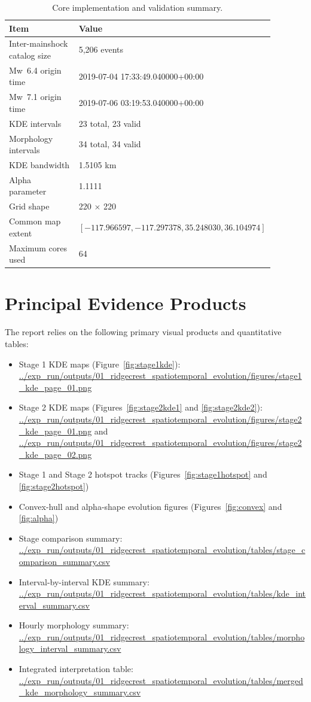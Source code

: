 \documentclass[11pt]{article}
\begin{document}
\begin{table}[H]
\centering
\caption{Core implementation and validation summary.}
\label{tab:workflow}
\begin{tabular}{p{0.42\linewidth}p{0.46\linewidth}}
\toprule
Item & Value \\
\midrule
Inter-mainshock catalog size & 5,206 events \\
Mw~6.4 origin time & 2019-07-04 17:33:49.040000+00:00 \\
Mw~7.1 origin time & 2019-07-06 03:19:53.040000+00:00 \\
KDE intervals & 23 total, 23 valid \\
Morphology intervals & 34 total, 34 valid \\
KDE bandwidth & 1.5105 km \\
Alpha parameter & 1.1111 \\
Grid shape & 220 $\times$ 220 \\
Common map extent & $[-117.966597, -117.297378, 35.248030, 36.104974]$ \\
Maximum cores used & 64 \\
\bottomrule
\end{tabular}
\end{table}

\section{Principal Evidence Products}
The report relies on the following primary visual products and quantitative tables:
\begin{itemize}[leftmargin=2em]
    \item Stage 1 KDE maps (Figure~\ref{fig:stage1kde}): \url{../exp_run/outputs/01_ridgecrest_spatiotemporal_evolution/figures/stage1_kde_page_01.png}
    \item Stage 2 KDE maps (Figures~\ref{fig:stage2kde1} and \ref{fig:stage2kde2}): \url{../exp_run/outputs/01_ridgecrest_spatiotemporal_evolution/figures/stage2_kde_page_01.png} and \url{../exp_run/outputs/01_ridgecrest_spatiotemporal_evolution/figures/stage2_kde_page_02.png}
    \item Stage 1 and Stage 2 hotspot tracks (Figures~\ref{fig:stage1hotspot} and \ref{fig:stage2hotspot})
    \item Convex-hull and alpha-shape evolution figures (Figures~\ref{fig:convex} and \ref{fig:alpha})
    \item Stage comparison summary: \url{../exp_run/outputs/01_ridgecrest_spatiotemporal_evolution/tables/stage_comparison_summary.csv}
    \item Interval-by-interval KDE summary: \url{../exp_run/outputs/01_ridgecrest_spatiotemporal_evolution/tables/kde_interval_summary.csv}
    \item Hourly morphology summary: \url{../exp_run/outputs/01_ridgecrest_spatiotemporal_evolution/tables/morphology_interval_summary.csv}
    \item Integrated interpretation table: \url{../exp_run/outputs/01_ridgecrest_spatiotemporal_evolution/tables/merged_kde_morphology_summary.csv}
\end{itemize}
\end{document}
